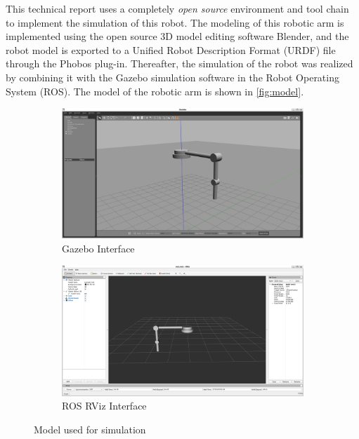 \documentclass{article}
\begin{document}

This technical report uses a completely \emph{open source} environment and tool chain to implement the simulation of this robot.
The modeling of this robotic arm is implemented using the open source 3D model editing software Blender, and the robot model is exported to a Unified Robot Description Format (URDF) file through the Phobos plug-in.
Thereafter, the simulation of the robot was realized by combining it with the Gazebo simulation software in the Robot Operating System (ROS).
The model of the robotic arm is shown in \autoref{fig:model}.

\begin{figure}[ht]
    \hfill
    \begin{subfigure}{0.45\linewidth}
        \centering
        \includegraphics[width=\linewidth]{figures/robotic-arm-gazebo}
        \caption{Gazebo Interface}
    \end{subfigure}
    \hfill
    \begin{subfigure}{0.45\linewidth}
        \centering
        \includegraphics[width=\linewidth]{figures/robotic-arm-rviz}
        \caption{ROS RViz Interface}
    \end{subfigure}
    \hfill
    \caption{Model used for simulation}
    \label{fig:model}
\end{figure}
\end{document}
